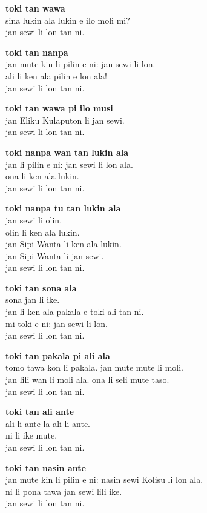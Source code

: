 \textbf{toki tan wawa}   \\
sina lukin ala lukin e ilo moli mi?   \\
jan sewi li lon tan ni.

\textbf{toki tan nanpa}   \\
jan mute kin li pilin e ni: jan sewi li lon.   \\
ali li ken ala pilin e lon ala!   \\
jan sewi li lon tan ni.

\textbf{toki tan wawa pi ilo musi}   \\
jan Eliku Kulaputon li jan sewi.   \\
jan sewi li lon tan ni.

\textbf{toki nanpa wan tan lukin ala }   \\
jan li pilin e ni: jan sewi li lon ala.   \\
ona li ken ala lukin.   \\
jan sewi li lon tan ni.

\textbf{toki nanpa tu tan lukin ala}   \\
jan sewi li olin.   \\
olin li ken ala lukin.   \\
jan Sipi Wanta li ken ala lukin.  \\
jan Sipi Wanta li jan sewi.   \\
jan sewi li lon tan ni.

\textbf{toki tan sona ala}   \\
sona jan li ike.   \\
jan li ken ala pakala e toki ali tan ni.   \\
mi toki e ni: jan sewi li lon.   \\
jan sewi li lon tan ni.

\textbf{toki tan pakala pi ali ala}   \\
tomo tawa kon li pakala. jan mute mute li moli.   \\
jan lili wan li moli ala. ona li seli mute taso.   \\
jan sewi li lon tan ni.

\textbf{toki tan ali ante}   \\
ali li ante la ali li ante.   \\
ni li ike mute.   \\
jan sewi li lon tan ni.

\textbf{toki tan nasin ante}   \\
jan mute kin li pilin e ni: nasin sewi Kolisu li lon ala.       \\
ni li pona tawa jan sewi lili ike.   \\
jan sewi li lon tan ni.

